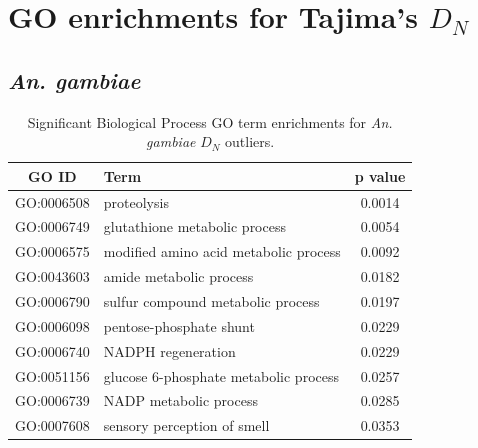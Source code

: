 \section{GO enrichments for \texorpdfstring{Tajima's $D_N$}{nonsynonymous Tajima's $D$}}

\subsection{\textit{An. gambiae}}
\begin{table}[H]
    \centering
    \begin{tabular}{clc}
        \toprule
        \textbf{GO ID}& \textbf{Term} & \textbf{p value}\\
        \midrule
        GO:0006508 & proteolysis & 0.0014 \\ 
        GO:0006749 & glutathione metabolic process & 0.0054 \\ 
        GO:0006575 & modified amino acid metabolic process & 0.0092 \\ 
        GO:0043603 & amide metabolic process & 0.0182 \\ 
        GO:0006790 & sulfur compound metabolic process & 0.0197 \\ 
        GO:0006098 & pentose-phosphate shunt & 0.0229 \\ 
        GO:0006740 & NADPH regeneration & 0.0229 \\ 
        GO:0051156 & glucose 6-phosphate metabolic process & 0.0257 \\ 
        GO:0006739 & NADP metabolic process & 0.0285 \\ 
        GO:0007608 & sensory perception of smell & 0.0353 \\ \bottomrule
    \end{tabular}

    \caption{Significant Biological Process GO term enrichments for \textit{An. gambiae} $D_N$ outliers.}
    \label{gambGOd}
    
\end{table}

